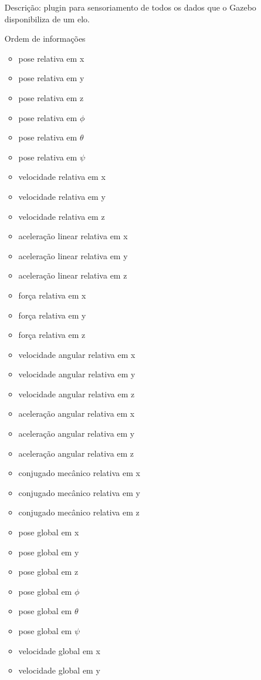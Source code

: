 \begin{itemize}
\begin{itemize}
\item[Descrição:] plugin para sensoriamento de todos os dados que o Gazebo disponibiliza de um elo. \\
\item[Ordem de informações]
\begin{itemize}
\item pose relativa em x
\item pose relativa em y
\item pose relativa em z
\item pose relativa em $\phi$
\item pose relativa em $\theta$
\item pose relativa em $\psi$
\item velocidade relativa em x
\item velocidade relativa em y
\item velocidade relativa em z
\item aceleração linear relativa em x
\item aceleração linear relativa em y
\item aceleração linear relativa em z
\item força relativa em x
\item força relativa em y
\item força relativa em z
\item velocidade angular relativa em x
\item velocidade angular relativa em y
\item velocidade angular relativa em z
\item aceleração angular relativa em x
\item aceleração angular relativa em y
\item aceleração angular relativa em z
\item conjugado mecânico relativa em x
\item conjugado mecânico relativa em y
\item conjugado mecânico relativa em z
\item pose global em x
\item pose global em y
\item pose global em z
\item pose global em $\phi$
\item pose global em $\theta$
\item pose global em $\psi$
\item velocidade global em x
\item velocidade global em y

\end{itemize}
\end{itemize}
\end{itemize}
